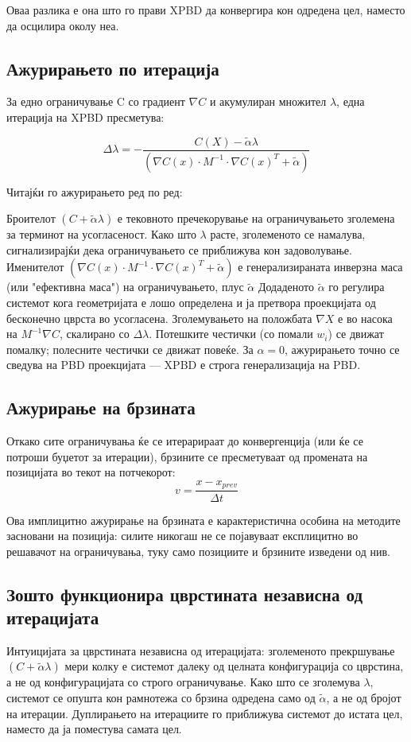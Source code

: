 Оваа разлика е она што го прави XPBD да конвергира кон одредена цел, наместо да осцилира околу неа.



\subsection{Ажурирањето по итерација}

За едно ограничување C со градиент $\nabla C$ и акумулиран множител $\lambda$, една итерација на XPBD пресметува:

$$\Delta \lambda = -\frac{C(X) - \tilde{\alpha} \lambda}{(\nabla C(x) \cdot M^{-1} \cdot \nabla C(x)^T + \tilde{\alpha})} $$

Читајќи го ажурирањето ред по ред:

Броителот $(C + \tilde{\alpha}\lambda)$  е тековното пречекорување на ограничувањето зголемена за терминот на усогласеност. Како што $\lambda$ расте, зголеменото  се намалува, сигнализирајќи дека ограничувањето се приближува кон задоволување.
Именителот $(\nabla C(x) \cdot M^{-1} \cdot \nabla C(x)^T + \tilde{\alpha})$ е генерализираната инверзна маса (или "ефективна маса") на ограничувањето, плус $\tilde{\alpha}$ Додаденото  $\tilde{\alpha}$ го регулира системот кога геометријата е лошо определена и ја претвора проекцијата од бесконечно цврста во усогласена.
Зголемувањето на положбата $\nabla X $ е во насока на $M^{-1} \nabla C$, скалирано со $\Delta \lambda$. Потешките честички (со помали $w_i$) се движат помалку; полесните честички се движат повеќе.
За $\alpha = 0$, ажурирањето точно се сведува на PBD проекцијата — XPBD е строга генерализација на PBD.

\subsection{Ажурирање на брзината}
Откако сите ограничувања ќе се итерарираат до конвергенција (или ќе се потроши буџетот за итерации), брзините се пресметуваат од промената на позицијата во текот на потчекорот:
$$v = \frac{x - x_{prev}}{\Delta t}$$

Ова имплицитно ажурирање на брзината е карактеристична особина на методите засновани на позиција: силите никогаш не се појавуваат експлицитно во решавачот на ограничувања, туку само позициите и брзините изведени од нив.

\subsection{Зошто функционира цврстината независна од итерацијата}
Интуицијата за цврстината независна од итерацијата: зголеменото прекршување $(C + \tilde{\alpha}\lambda)$ мери колку е системот далеку од целната конфигурација со цврстина, а не од конфигурацијата со строго ограничување. Како што се зголемува $\lambda$, системот се опушта кон рамнотежа со брзина одредена само од $\tilde{\alpha}$, а не од бројот на итерации. Дуплирањето на итерациите го приближува системот до истата цел, наместо да ја поместува самата цел.

